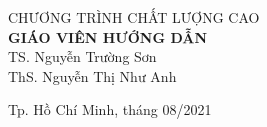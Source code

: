 \begin{titlepage}
\begin{center}
\large CHƯƠNG TRÌNH CHẤT LƯỢNG CAO\\[1cm]


\textbf{GIÁO VIÊN HƯỚNG DẪN}\\
TS. Nguyễn Trường Sơn\\
ThS. Nguyễn Thị Như Anh


\vfill
Tp. Hồ Chí Minh, tháng 08/2021

\end{center}

\end{titlepage}